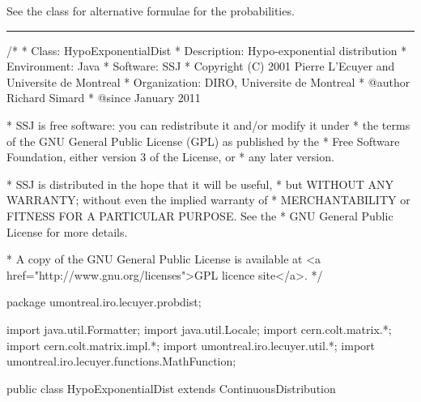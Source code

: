 See the class  for alternative formulae
for the probabilities.



\bigskip\hrule

\begin{code}\begin{hide}
/*
 * Class:        HypoExponentialDist
 * Description:  Hypo-exponential distribution
 * Environment:  Java
 * Software:     SSJ
 * Copyright (C) 2001  Pierre L'Ecuyer and Universite de Montreal
 * Organization: DIRO, Universite de Montreal
 * @author       Richard Simard
 * @since        January 2011

 * SSJ is free software: you can redistribute it and/or modify it under
 * the terms of the GNU General Public License (GPL) as published by the
 * Free Software Foundation, either version 3 of the License, or
 * any later version.

 * SSJ is distributed in the hope that it will be useful,
 * but WITHOUT ANY WARRANTY; without even the implied warranty of
 * MERCHANTABILITY or FITNESS FOR A PARTICULAR PURPOSE.  See the
 * GNU General Public License for more details.

 * A copy of the GNU General Public License is available at
   <a href="http://www.gnu.org/licenses">GPL licence site</a>.
 */
\end{hide}
package umontreal.iro.lecuyer.probdist;
\begin{hide}
import java.util.Formatter;
import java.util.Locale;
import cern.colt.matrix.*;
import cern.colt.matrix.impl.*;
import umontreal.iro.lecuyer.util.*;
import umontreal.iro.lecuyer.functions.MathFunction;
\end{hide}

public class HypoExponentialDist extends ContinuousDistribution\begin{hide} {
   protected double[] m_lambda;

   protected static void testLambda (double[] lambda) {
      int m = lambda.length;
      for (int j = 0; j < m; ++j) {
         if (lambda[j] <= 0)
            throw new IllegalArgumentException ("lambda_j <= 0");
      }
   }


   // Builds the bidiagonal matrix A out of the lambda
   private static DoubleMatrix2D buildMatrix (double[] lambda, double x) {
      int m = lambda.length;
      testLambda (lambda);
      DoubleFactory2D F2 = DoubleFactory2D.dense;
      DoubleMatrix2D A = F2.make(m, m);
      for (int j = 0; j < m-1; j++) {
         A.setQuick(j, j, -lambda[j]*x);
         A.setQuick(j, j + 1, lambda[j]*x);
      }
      A.setQuick(m-1, m-1, -lambda[m-1]*x);
      return A;
   }


   private static class myFunc implements MathFunction {
      // For inverseF
      private double[] m_lam;
      private double m_u;

      public myFunc (double[] lam, double u) {
         m_lam = lam;
         m_u = u;
      }

      public double evaluate (double x) {
         return m_u - HypoExponentialDist.cdf(m_lam, x);
      }
   }
\end{hide}
\end{code}
